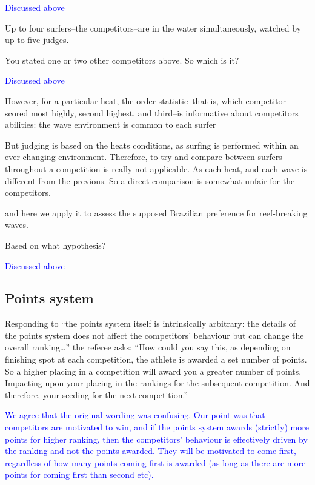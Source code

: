 \documentclass[12pt]{article}
\begin{document}
\textcolor{blue}{Discussed above}


Up to four surfers--the competitors--are in the water simultaneously,
watched by up to five judges.

You stated one or two other competitors above. So which is it?

\textcolor{blue}{Discussed above}


However, for a particular heat, the order statistic--that is, which
competitor scored most highly, second highest, and third--is
informative about competitors abilities: the wave environment is
common to each surfer

But judging is based on the heats conditions, as surfing is performed
within an ever changing environment. Therefore, to try and compare
between surfers throughout a competition is really not applicable. As
each heat, and each wave is different from the previous. So a direct
comparison is somewhat unfair for the competitors.



and here we apply it to assess the supposed Brazilian preference for
reef-breaking waves.

Based on what hypothesis?

\textcolor{blue}{Discussed above}

\subsection*{Points system}

Responding to ``the points system itself is intrinsically arbitrary:
the details of the points system does not affect the competitors'
behaviour but can change the overall ranking\ldots'' the referee asks:
``How could you say this, as depending on finishing spot at each
competition, the athlete is awarded a set number of points. So a
higher placing in a competition will award you a greater number of
points. Impacting upon your placing in the rankings for the subsequent
competition. And therefore, your seeding for the next competition.''

\textcolor{blue}{We agree that the original wording was confusing.
  Our point was that competitors are motivated to win, and if the
  points system awards (strictly) more points for higher ranking, then
  the competitors' behaviour is effectively driven by the ranking and
  not the points awarded.  They will be motivated to come first,
  regardless of how many points coming first is awarded (as long as
  there are more points for coming first than second etc).  }
\end{document}
